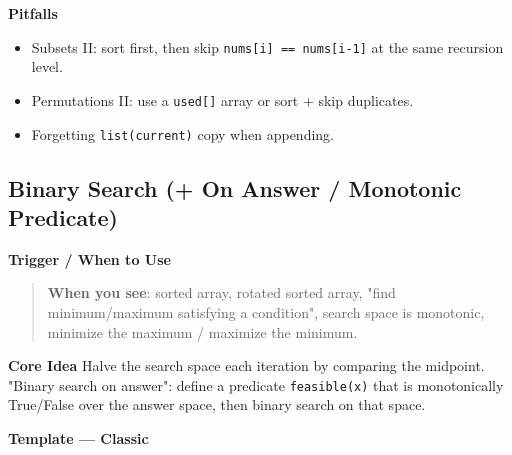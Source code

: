 \documentclass[11pt]{article}
\providecommand{\tightlist}{\setlength{\itemsep}{1pt}\setlength{\parskip}{0pt}}
\begin{document}
\textbf{Pitfalls}

\begin{itemize}
\tightlist
\item
  Subsets II: sort first, then skip \texttt{nums{[}i{]}\ ==\ nums{[}i-1{]}} at the same recursion level.
\item
  Permutations II: use a \texttt{used{[}{]}} array or sort + skip duplicates.
\item
  Forgetting \texttt{list(current)} copy when appending.
\end{itemize}

\subsection{Binary Search (+ On Answer / Monotonic Predicate)}\label{binary-search--on-answer--monotonic-predicate}

\textbf{Trigger / When to Use}

\begin{quote}
\textbf{When you see}: sorted array, rotated sorted array, "find minimum/maximum satisfying a condition", search space is monotonic, minimize the maximum / maximize the minimum.
\end{quote}

\textbf{Core Idea}
Halve the search space each iteration by comparing the midpoint. "Binary search on answer": define a predicate \texttt{feasible(x)} that is monotonically True/False over the answer space, then binary search on that space.

\textbf{Template --- Classic}

\end{document}
